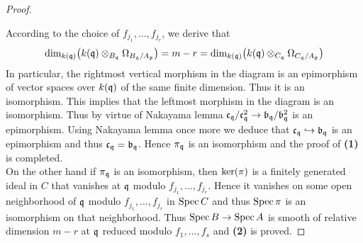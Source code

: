\begin{proof}
\begin{center}
\end{center}
According to the choice of $f_{j_1},...,f_{j_r}$, we derive that
$$\mathrm{dim}_{k(\mathfrak{q})}\big(k(\mathfrak{q})\otimes_{B_{\mathfrak{q}}}\Omega_{B_{\mathfrak{q}}/A_{\mathfrak{p}}}\big) = m - r = \mathrm{dim}_{k(\mathfrak{q})}\big(k(\mathfrak{q})\otimes_{C_{\mathfrak{q}}}\Omega_{C_{\mathfrak{q}}/A_{\mathfrak{p}}}\big)$$
In particular, the rightmost vertical morphism in the diagram is an epimorphism of vector spaces over $k(\mathfrak{q})$ of the same finite dimension. Thus it is an isomorphism. This implies that the leftmost morphism in the diagram is an isomorphism. Thus by virtue of Nakayama lemma $\mathfrak{c}_{\mathfrak{q}}/\mathfrak{c}^2_{\mathfrak{q}}\rightarrow \mathfrak{b}_{\mathfrak{q}}/\mathfrak{b}^2_{\mathfrak{q}}$ is an epimorphism. Using Nakayama lemma once more we deduce that $\mathfrak{c}_{\mathfrak{q}} \hookrightarrow \mathfrak{b}_{\mathfrak{q}}$ is an epimorphism and thus $\mathfrak{c}_{\mathfrak{q}} = \mathfrak{b}_{\mathfrak{q}}$. Hence $\pi_{\mathfrak{q}}$ is an isomorphism and the proof of \textbf{(1)} is completed.\\
On the other hand if $\pi_{\mathfrak{q}}$ is an isomorphism, then $\mathrm{ker}(\pi)$ is a finitely generated ideal in $C$ that vanishes at $\mathfrak{q}$ modulo $f_{j_1},...,f_{j_r}$. Hence it vanishes on some open neighborhood of $\mathfrak{q}$ modulo $f_{j_1},...,f_{j_r}$ in $\mathrm{Spec}\, C$ and thus $\mathrm{Spec}\, \pi$ is an isomorphism on that neighborhood. Thus $\mathrm{Spec}\, B\rightarrow \mathrm{Spec}\, A$ is smooth of relative dimension $m-r$ at $\mathfrak{q}$ reduced modulo $f_1,...,f_s$ and \textbf{(2)} is proved.
\end{proof}

